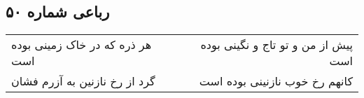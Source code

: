 \begin{center}
\section*{رباعی شماره ۵۰}
\label{sec:sh050}
\begin{longtable}{l p{0.5cm} r}
هر ذره که در خاک زمینی بوده است
&&
پیش از من و تو تاج و نگینی بوده است
\\
گرد از رخ نازنین به آزرم فشان
&&
کانهم رخ خوب نازنینی بوده است
\\
\end{longtable}
\end{center}
